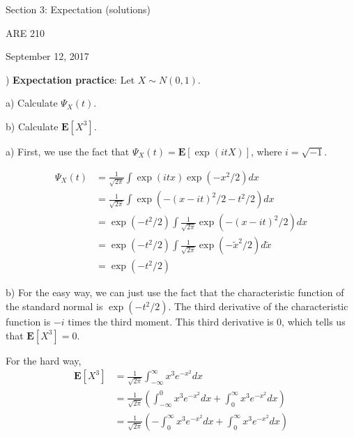 \documentclass[12pt,english]{article}
\begin{document}
\begin{center}
{\Large{}Section 3: Expectation (solutions)}
\par\end{center}{\Large \par}

\begin{center}
ARE 210
\par\end{center}

\begin{center}
September 12, 2017
\par\end{center}

) \textbf{Expectation practice}: Let $X \sim N(0, 1)$.

\noindent
a) Calculate $\Psi_{X}(t)$.

\noindent
b) Calculate $\mathbf{E}[X^{3}]$.
\vspace{1em}

a) First, we use the fact that $\Psi_{X}(t) = \mathbf{E}[\exp(itX)]$, where $i = \sqrt{-1}$.

\begin{align*}
\Psi_{X}(t) & = \frac{1}{\sqrt{2\pi}} \int \exp(itx) \exp(-x^{2}/2) dx \\
& = \frac{1}{\sqrt{2\pi}} \int \exp(-(x - it)^{2}/2 - t^{2}/2) dx \\
& = \exp(-t^{2}/2) \int \frac{1}{\sqrt{2\pi}} \exp(-(x - it)^{2}/2) dx \\
& = \exp(-t^{2}/2) \int \frac{1}{\sqrt{2\pi}} \exp(-\widetilde{x}^{2}/2) d\widetilde{x} \\
& = \exp(-t^{2} / 2)
\end{align*}

b) For the easy way, we can just use the fact that the characteristic function of the standard normal is $\exp(-t^{2} / 2)$. The third derivative of the characteristic function is $-i$ times the third moment. This third derivative is 0, which tells us that $\mathbf{E}[X^{3}] = 0$.

For the hard way,
\begin{align*}
\mathbf{E}[X^{3}] & = \frac{1}{\sqrt{2\pi}} \int_{-\infty}^{\infty} x^{3} e^{-x^{2}} dx \\
& = \frac{1}{\sqrt{2\pi}} \left( \int_{-\infty}^{0} x^{3} e^{-x^{2}} dx + \int_{0}^{\infty} x^{3} e^{-x^{2}} dx \right) \\
& = \frac{1}{\sqrt{2\pi}} \left( - \int_{0}^{\infty} x^{3} e^{-x^{2}} dx + \int_{0}^{\infty} x^{3} e^{-x^{2}} dx \right)
\end{align*}
\end{document}
